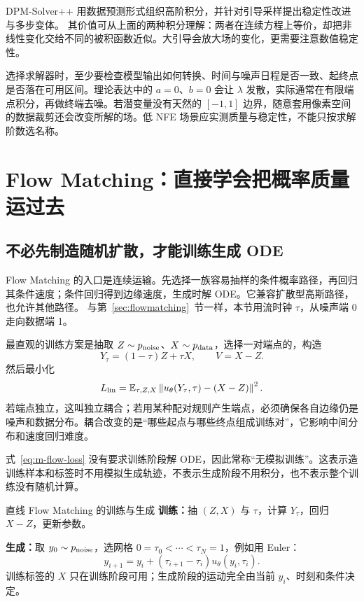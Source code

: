 DPM-Solver++ 用数据预测形式组织高阶积分，并针对引导采样提出稳定性改进与多步变体。\cite{m_dpmsolverpp} 其价值可从上面的两种积分理解：两者在连续方程上等价，却把非线性变化交给不同的被积函数近似。大引导会放大场的变化，更需要注意数值稳定性。

选择求解器时，至少要检查模型输出如何转换、时间与噪声日程是否一致、起终点是否落在可用区间。理论表达中的 $a=0$、$b=0$ 会让 $\lambda$ 发散，实际通常在有限端点积分，再做终端去噪。若潜变量没有天然的 $[-1,1]$ 边界，随意套用像素空间的数据裁剪还会改变所解的场。低 NFE 场景应实测质量与稳定性，不能只按求解阶数选名称。

\section{Flow Matching：直接学会把概率质量运过去}
\label{sec:m-flow}

\subsection{不必先制造随机扩散，才能训练生成 ODE}

Flow Matching 的入口是连续运输。先选择一族容易抽样的条件概率路径，再回归其条件速度；条件回归得到边缘速度，生成时解 ODE。它兼容扩散型高斯路径，也允许其他路径。\cite{r_fm} 与第~\ref{sec:flowmatching}~节一样，本节用流时钟 $\tau$，从噪声端 0 走向数据端 1。

最直观的训练方案是抽取 $Z\sim p_{\mathrm{noise}}$、$X\sim p_{\mathrm{data}}$，选择一对端点的，构造
\begin{equation}
Y_\tau=(1-\tau)Z+\tau X,\qquad
V=X-Z.
\label{eq:m-linear-flow}
\end{equation}
然后最小化
\begin{equation}
L_{\mathrm{lin}}
=\mathbb{E}_{\tau,Z,X}\left\lVert u_\theta(Y_\tau,\tau)-(X-Z)\right\rVert^2.
\label{eq:m-flow-loss}
\end{equation}
若端点独立，这叫独立耦合；若用某种配对规则产生端点，必须确保各自边缘仍是噪声和数据分布。耦合改变的是“哪些起点与哪些终点组成训练对”，它影响中间分布和速度回归难度。

式~\eqref{eq:m-flow-loss} 没有要求训练阶段解 ODE，因此常称“无模拟训练”。这表示造训练样本和标签时不用模拟生成轨迹，不表示生成阶段不用积分，也不表示整个训练没有随机计算。

\begin{examplebox}{直线 Flow Matching 的训练与生成}
\textbf{训练：}抽 $(Z,X)$ 与 $\tau$，计算 $Y_\tau$，回归 $X-Z$，更新参数。

\textbf{生成：}取 $y_0\sim p_{\mathrm{noise}}$，选网格
$0=\tau_0<\cdots<\tau_N=1$，例如用 Euler：
\[
 y_{i+1}=y_i+(\tau_{i+1}-\tau_i)u_\theta(y_i,\tau_i).
\]
训练标签的 $X$ 只在训练阶段可用；生成阶段的运动完全由当前 $y_i$、时刻和条件决定。
\end{examplebox}

